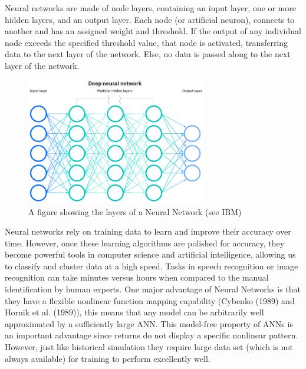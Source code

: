 \documentclass[a4paper,11pt,oneside]{book}
\begin{document}
Neural networks are made of node layers, containing an input layer, one or more hidden layers, and an output layer. Each node (or artificial neuron), connects to another and has an assigned weight and threshold. If the output of any individual node exceeds the specified threshold value, that node is activated, transferring data to the next layer of the network. Else, no data is passed along to the next layer of the network.
\begin{figure}[!h]
	\centering
	\includegraphics[width=0.7\textwidth]{figures/NN}
	\caption{A figure showing the layers of a Neural Network (see IBM)}
	\label{firstfig}
\end{figure}\newline
Neural networks rely on training data to learn and improve their accuracy over time. However, once these learning algorithms are polished for accuracy, they become powerful tools in computer science and artificial intelligence, allowing us to classify and cluster data at a high speed. Tasks in speech recognition or image recognition can take minutes versus hours when compared to the manual identification by human experts.
\newline\newline
One major advantage of Neural Networks is that they have a flexible nonlinear
function mapping capability (Cybenko (1989) and Hornik et al. (1989)), this means that any model can be arbitrarily well
approximated by a sufficiently large ANN. This model-free property of ANNs is an
important advantage since returns do not display a specific nonlinear pattern. However, just like historical simulation they require large data set (which is not always available) for training to perform excellently well.
\end{document}
